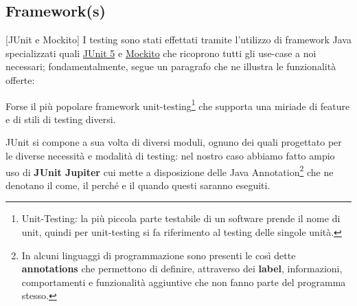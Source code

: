 \subsection{Framework(s)}[JUnit e Mockito]
I testing sono stati effettati tramite l'utilizzo di framework Java specializzati quali
\href{https://junit.org/junit5/}{JUnit 5} e \href{https://site.mockito.org}{Mockito}
che ricoprono tutti gli use-case a noi necessari; fondamentalmente, segue un paragrafo
che ne illustra le funzionalità offerte:
\begin{description}[leftmargin=!,labelwidth=\widthof{\bfseries JUnit 5 Jupiter}, font=\color{ddchaptercolor!70!black}]
	\item[JUnit 5] Forse il più popolare framework unit-testing\footnote{Unit-Testing: la più piccola parte testabile
		di un software prende il nome di unit, quindi per unit-testing si fa riferimento al testing
		delle singole unità.} che supporta 
		una miriade di feature e di stili di testing diversi.
		\par\vspace{3mm}
		JUnit si compone a sua volta di diversi moduli, ognuno dei quali progettato per
		le diverse necessità e modalità di testing: nel nostro caso abbiamo fatto ampio
		uso di \textbf{JUnit Jupiter} cui mette a disposizione delle Java Annotation\footnote{In alcuni
		linguaggi di programmazione sono presenti le così dette \textbf{annotations} che permettono
		di definire, attraverso dei \textbf{label}, informazioni, comportamenti e funzionalità
		aggiuntive che non fanno parte del programma stesso.} che
		ne denotano il come, il perché e il quando questi saranno eseguiti.


\end{description}
